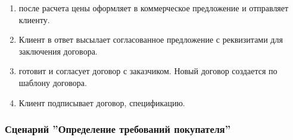\begin{enumerate}
\item	\manager после расчета цены оформляет в  коммерческое предложение и отправляет клиенту.

\item Клиент в ответ высылает \manager  согласованное предложение с реквизитами для заключения договора. 

\item \manager готовит и согласует договор с заказчиком. Новый договор создается по шаблону договора.


\item Клиент подписывает договор, спецификацию. %
\end{enumerate}



\subsubsection{Сценарий ''Определение требований покупателя''}
\label{bp:sales_3}

